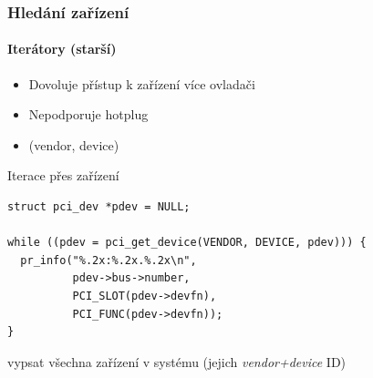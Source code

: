 \iffimuni
\begin{frame}[fragile]
  \frametitle{Hledání zařízení}
  \framesubtitle{Iterátory (starší)}

  \begin{itemize}
    \item Dovoluje přístup k zařízení více ovladači
    \item Nepodporuje hotplug
    \item {} (vendor, device)
  \end{itemize}

  \pause

  \begin{block}{Iterace přes zařízení}
    \begin{lstlisting}[aboveskip=2pt,belowskip=2pt]
struct pci_dev *pdev = NULL;

while ((pdev = pci_get_device(VENDOR, DEVICE, pdev))) {
  pr_info("%.2x:%.2x.%.2x\n",
          pdev->bus->number,
          PCI_SLOT(pdev->devfn),
          PCI_FUNC(pdev->devfn));
}
    \end{lstlisting} %
  \end{block}

  \pause
  \smallskip

   vypsat všechna zařízení v systému (jejich
  \emph{vendor+device} ID)

\end{frame}
\fi

